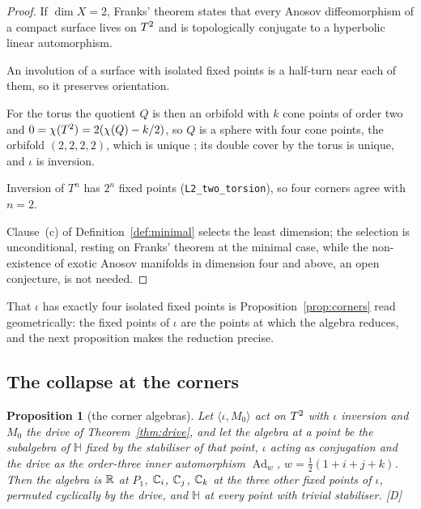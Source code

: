 \documentclass[11pt,a4paper]{article}
\theoremstyle{plain}
\newtheorem{proposition}[theorem]{Proposition}
\theoremstyle{definition}
\theoremstyle{remark}
\newcommand{\Hquat}{\mathbb{H}}
\newcommand{\Ad}{\operatorname{Ad}}
\newcommand{\rigD}{[\textup{D}]}
\begin{document}
\begin{proof}
If $\dim X=2$, Franks' theorem \cite{Franks1970} states that every Anosov diffeomorphism of a compact surface lives on $T^2$ and is topologically conjugate to a hyperbolic linear automorphism.

An involution of a surface with isolated fixed points is a half-turn near each of them, so it preserves orientation.

For the torus the quotient $Q$ is then an orbifold with $k$ cone points of order two and $0=\chi(T^2)=2(\chi(Q)-k/2)$, so $Q$ is a sphere with four cone points, the orbifold $(2,2,2,2)$, which is unique \cite{Thurston}; its double cover by the torus is unique, and $\iota$ is inversion.

Inversion of $T^{n}$ has $2^{n}$ fixed points (\texttt{L2\_two\_torsion}), so four corners agree with $n=2$.

Clause~(c) of Definition~\ref{def:minimal} selects the least dimension; the selection is unconditional, resting on Franks' theorem at the minimal case, while the non-existence of exotic Anosov manifolds in dimension four and above, an open conjecture, is not needed.
\end{proof}

That $\iota$ has exactly four isolated fixed points is Proposition~\ref{prop:corners} read geometrically: the fixed points of $\iota$ are the points at which the algebra reduces, and the next proposition makes the reduction precise.

\subsection{The collapse at the corners}

\begin{proposition}[the corner algebras]\label{prop:collapse}
Let $\langle\iota,M_{0}\rangle$ act on $T^2$ with $\iota$ inversion and $M_{0}$ the drive of Theorem~\ref{thm:drive}, and let the algebra at a point be the subalgebra of $\Hquat$ fixed by the stabiliser of that point, $\iota$ acting as conjugation and the drive as the order-three inner automorphism $\Ad_{w}$, $w=\tfrac12(1+i+j+k)$. Then the algebra is $\mathbb{R}$ at $P_{1}$, $\mathbb{C}_{i}$, $\mathbb{C}_{j}$, $\mathbb{C}_{k}$ at the three other fixed points of $\iota$, permuted cyclically by the drive, and $\Hquat$ at every point with trivial stabiliser. \rigD
\end{proposition}
\end{document}
